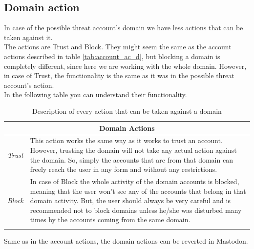 \subsection{Domain action}\label{ss:dmn_action}
In case of the possible threat account's domain we have less actions that can be taken against it. 
\\[5pt]
The actions are Trust and Block. They might seem the same as the account actions described in table \ref{tab:account_ac_d}, but blocking a domain is completely different, since here we are working with the whole domain. However, in case of Trust, the functionality is the same as it was in the possible threat account's action.
\\[5pt]
In the following table you can understand their functionality.
\begin{center}
	\begin{longtable}{ | p{} | p{} | }
		
		\hline
		\multicolumn{2}{|c|}{\textbf{Domain Actions}}
		\\ \hline
		
		
		\hline
		\endfirsthead %
		
		\hline
		\hline
		\endhead %
		
		\hline
		\endfoot %
		
		\endlastfoot %
		
		\emph{Trust}
		& This action works the same way as it works to trust an account. However, trusting the domain will not take any actual action against the domain. So, simply the accounts that are from that domain can freely reach the user in any form and without any restrictions.
		\\ \hline
		
		\emph{Block}
		& In case of Block the whole activity of the domain accounts is blocked, meaning that the user won't see any of the accounts that belong in that domain activity. But, the user should always be very careful and is recommended not to block domains unless he/she was disturbed many times by the accounts coming from the same domain.
		\\ \hline

		\caption{Description of every action that can be taken against a domain}
		\label{tab:account_do_d}		
	\end{longtable}
\end{center}
Same as in the account actions, the domain actions can be reverted in Mastodon.
